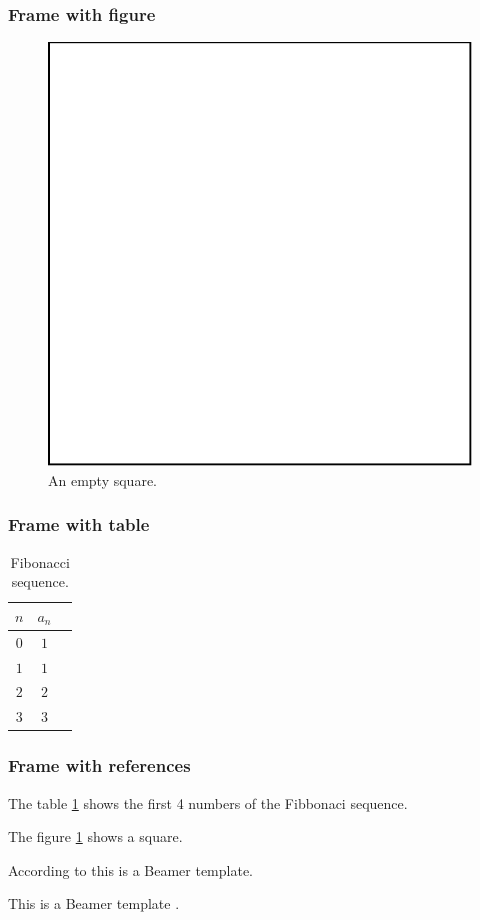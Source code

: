 \documentclass[aspectratio=169, 12pt]{beamer}
\begin{document}
\begin{frame}
    \frametitle{Frame with figure}
    \begin{figure}
        \centering
        \includegraphics[height=0.7\textheight]{fig/square.eps}
        \caption{An empty square.}
        \label{fig:square}
    \end{figure}
\end{frame}

\begin{frame}
    \frametitle{Frame with table}
    \begin{table}
        \centering
        \caption{Fibonacci sequence.}
        \begin{tabular}{ccc}
            \toprule
            $n$ & $a_n$ \\
            \midrule
            $0$ & $1$ \\
            $1$ & $1$ \\
            $2$ & $2$ \\
            $3$ & $3$ \\
            \bottomrule
        \end{tabular}
        \label{tab:fibonacci_sequence}
    \end{table}
\end{frame}

\begin{frame}
    \frametitle{Frame with references}
    The table \ref{tab:fibonacci_sequence} shows the first 4 numbers of the Fibbonaci sequence.

    The figure \ref{fig:square} shows a square.

    According to \textcite{key} this is a Beamer template.

    This is a Beamer template \cite{key}.

\end{frame}

\begin{frame}[allowframebreaks]
    \printbibliography
\end{frame}
\end{document}
